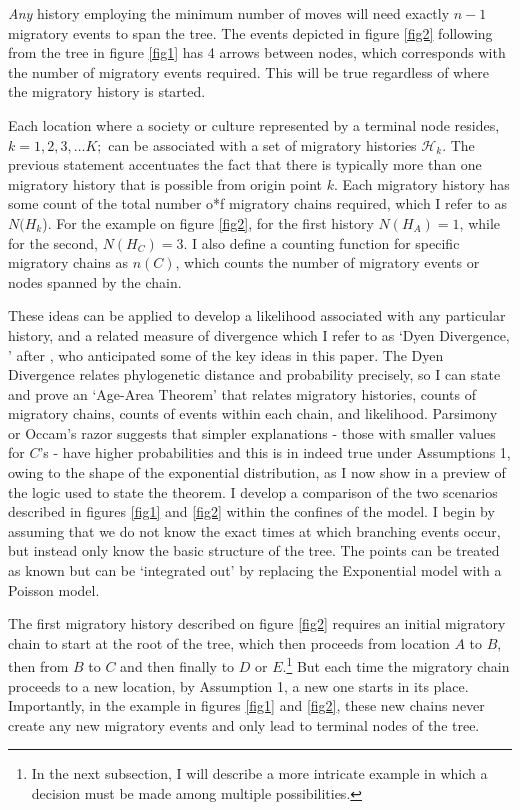 \documentclass[11pt]{article}
\begin{document}
\textit{Any} history employing the minimum number of moves will need exactly $n-1$ migratory events to span the tree. The events depicted in figure \ref{fig2} following from the tree in figure \ref{fig1} has 4 arrows between nodes, which corresponds with the number of migratory events required. This will be true regardless of where the migratory history is started. 

Each location where a society or culture represented by a terminal node resides,  $k=1,2,3,\hdots K;$ can be associated with a set of migratory histories $\mathcal{H}_k$. The previous statement accentuates the fact that there is typically more than one migratory history that is possible from origin point $k$. Each migratory history has some count of the total number o*f migratory chains required, which I refer to as  $N(H_k$). For the example on figure \ref{fig2}, for the first history $N(H_A)=1$, while for the second, $N(H_C)=3$.    I also define a counting function for specific migratory chains as $n(C)$, which counts the number of migratory events or nodes spanned by the chain. 

These ideas can be applied to develop a likelihood associated with any particular history, and a related measure of divergence which I refer to as `Dyen Divergence, ' after \cite{dyen56}, who anticipated some of the key ideas in this paper. The Dyen Divergence relates phylogenetic distance and probability precisely, so I  can state and prove an `Age-Area Theorem' that relates  migratory histories, counts of migratory chains, counts of events within each chain, and likelihood. Parsimony or Occam's razor suggests that simpler explanations - those with smaller values for $C$'s - have higher probabilities and this is in indeed true under Assumptions 1, owing to the shape of the exponential distribution, as I now show in a preview of the logic used to state the theorem.
 I  develop a comparison of the two scenarios described in figures \ref{fig1} and \ref{fig2} within the confines of the model. I begin by assuming that we do not know the exact times at which branching events occur, but instead only know the basic structure of the tree. The points can be treated as known but can be `integrated out' by replacing the Exponential model with a Poisson model. 

The first migratory history described on figure \ref{fig2} requires an initial migratory chain to start at the root of the tree, which then proceeds from location $A$ to $B$, then from $B$ to $C$ and then finally to $D$ or $E$.\footnote{In the next subsection, I will describe a more intricate example in which a decision must be made among multiple possibilities.} But each time the migratory chain proceeds to a new location, by Assumption 1, a new one starts in its place. Importantly, in the example in figures \ref{fig1} and \ref{fig2}, these new chains never create any new migratory events and only lead to terminal nodes of the tree. 
\end{document}
